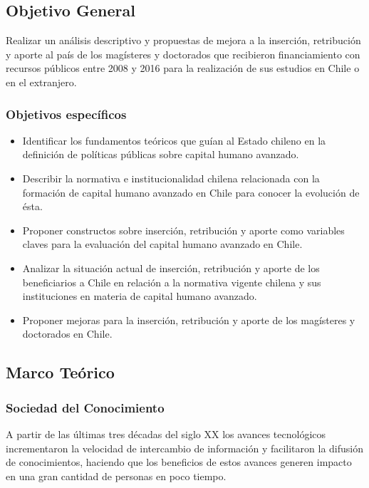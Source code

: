 \documentclass{article}
\begin{document}
\subsection{Objetivo General}

Realizar un análisis descriptivo y propuestas de mejora a la inserción, retribución y aporte al país de los magísteres y doctorados que recibieron financiamiento con recursos públicos entre 2008 y 2016 para la realización de sus estudios en Chile o en el extranjero.

\subsubsection{Objetivos específicos}

\begin{itemize}
    \item Identificar los fundamentos teóricos que guían al Estado chileno en la definición de políticas públicas sobre capital humano avanzado.
    \item Describir la normativa e institucionalidad chilena relacionada con la formación de capital humano avanzado en Chile para conocer la evolución de ésta.
    \item Proponer constructos sobre inserción, retribución y aporte como variables claves para la evaluación del capital humano avanzado en Chile.
    \item Analizar la situación actual de inserción, retribución y aporte de los beneficiarios a Chile en relación a la normativa vigente chilena y sus instituciones en materia de capital humano avanzado.
    \item Proponer mejoras para la inserción, retribución y aporte de los magísteres y doctorados en Chile.
\end{itemize}

\subsection{Marco Teórico}

\subsubsection{Sociedad del Conocimiento}
A partir de las últimas tres décadas del siglo XX los avances tecnológicos incrementaron la velocidad de intercambio de información y facilitaron la difusión de conocimientos, haciendo que los beneficios de estos avances generen impacto en una gran cantidad de personas en poco tiempo.
\end{document}

